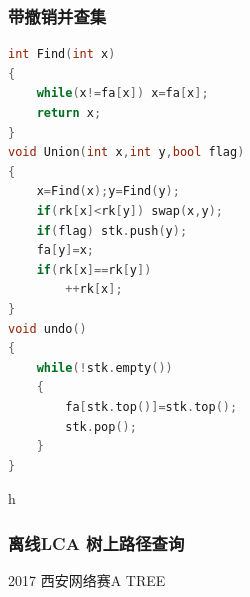\documentclass[UTF8,a4paper,titlepage]{ctexart}
\begin{document}
    \subsubsection*{带撤销并查集}
     \begin{lstlisting}[language=C++]
int Find(int x)
{
    while(x!=fa[x]) x=fa[x];
    return x;
}
void Union(int x,int y,bool flag)
{
    x=Find(x);y=Find(y);
    if(rk[x]<rk[y]) swap(x,y);
    if(flag) stk.push(y);
    fa[y]=x;
    if(rk[x]==rk[y])
        ++rk[x];
}
void undo()
{
    while(!stk.empty())
    {
        fa[stk.top()]=stk.top();
        stk.pop();
    }
}
    \end{lstlisting}
h   \subsubsection*{离线LCA 树上路径查询}
2017 西安网络赛A TREE
\end{document}
